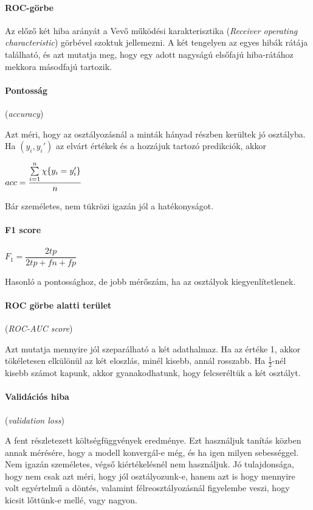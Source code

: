 \paragraph{ROC-görbe}
Az előző két hiba arányát a Vevő működési karakterisztika 
(\textit{Receiver operating characteristic}) 
görbével szoktuk jellemezni. A két tengelyen az egyes hibák 
rátája található, és azt mutatja meg, hogy egy adott nagyságú elsőfajú 
hiba-rátához mekkora másodfajú tartozik.



\paragraph{Pontosság} (\textit{accuracy})

Azt méri, hogy az osztályozásnál a minták hányad részben
kerültek jó osztályba.
Ha $ (y_i, y_i') $ az elvárt értékek és a hozzájuk tartozó 
predikciók, akkor

$ acc = \dfrac{\sum\limits_{{i}=1}^{n} \chi\{y_i = y_i'\}}{n} $ 

Bár személetes, nem tükrözi igazán jól a hatékonyságot.


\paragraph{F1 score} \mbox{} 


$ F_1 = \dfrac{2tp}{2tp + fn + fp} $

\noindent
Hasonló a pontossághoz, de jobb mérőszám, ha az osztályok kiegyenlítetlenek.



\paragraph{ROC görbe alatti terület} (\textit{ROC-AUC score})

Azt mutatja mennyire jól szeparálható a két adathalmaz. 
Ha az értéke 1, akkor tökéletesen elkülönül az két eloszlás, 
minél kisebb, annál rosszabb. Ha $ \frac{1}{2} $-nél kisebb számot kapunk,
akkor gyanakodhatunk, hogy felcseréltük a két osztályt.

\paragraph{Validációs hiba} (\textit{validation loss})

A fent részletezett költségfüggvények eredménye. Ezt használjuk
tanítás közben annak mérésére, hogy a modell konvergál-e még,
és ha igen milyen sebességgel. Nem igazán személetes, végső kiértékelésnél
nem használjuk. Jó tulajdonsága, hogy nem csak azt méri, hogy jól
osztályozunk-e, hanem azt is hogy mennyire volt egyértelmű a döntés,
valamint félreosztályozásnál figyelembe veszi, hogy kicsit lőttünk-e
mellé, vagy nagyon.



